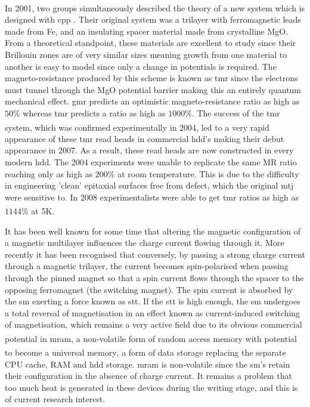 \documentclass[a4paper, 12pt]{article}
\newcommand{\site}[1]{\textsuperscript{\textcolor{blue}{\cite{#1}}}}
\begin{document}
	\par In 2001, two groups simultaneously described the theory of a new system\textsuperscript{\textcolor{blue}{\cite{tunnel1,tunnel2}}} which is designed with \gls{cpp} . Their original system was a trilayer with ferromagnetic leads made from Fe, and an insulating spacer material made from crystalline MgO. From a theoretical standpoint, these materials are excellent to study since their Brillouin zones are of very similar sizes meaning growth from one material to another is easy to model since only a change in potentials is required. The magneto-resistance produced by this scheme is known as \gls{tmr} since the electrons must tunnel through the MgO potential barrier making this an entirely quantum mechanical effect. \gls{gmr} predicts an optimistic magneto-resistance ratio as high as $50\%$ whereas \gls{tmr} predicts a ratio as high as $1000\%$.
	The success of the \gls{tmr} system, which was confirmed experimentally in 2004\textsuperscript{\textcolor{blue}{\cite{2004,2004P}}}, led to a very rapid appearance of these \gls{tmr} read heads in commercial \gls{hdd}'s making their debut appearance in 2007. As a result, these read heads are now constructed in every modern \gls{hdd}. The 2004 experiments were unable to replicate the same MR ratio reaching only as high as $200\%$ at room temperature. This is due to the difficulty in engineering 'clean' epitaxial surfaces free from defect, which the original \gls{mtj} were sensitive to. In 2008 experimentalists were able to get \gls{tmr} ratios as high as $1144\%$ at 5K\textsuperscript{\textcolor{blue}{\cite{1100}}}.
	\par It	has been well known for some time that altering the magnetic configuration of a magnetic multilayer influences the charge current flowing through it. More recently it has been recognised that conversely, by passing a strong charge current through a magnetic trilayer, the current becomes spin-polarised when passing through the pinned magnet so that a spin current flows through the spacer to the opposing ferromagnet (the switching magnet). The spin current is absorbed by the \gls{sm} exerting a force known as \gls{stt}. If the \gls{stt} is high enough, the \gls{sm} undergoes a total reversal of magnetisation in an effect known as current-induced switching of magnetisation, which remains a very active field due to its obvious commercial potential in \gls{mram}\textsuperscript{\textcolor{blue}{\cite{stt}}}, a non-volatile form of random access memory with potential to become a universal memory\site{universal}, a form of data storage replacing the separate CPU cache, RAM and \gls{hdd} storage. \gls{mram} is non-volatile since the \gls{sm}'s retain their configuration in the absence of charge current. It remains a problem that too much heat is generated in these devices during the writing stage, and this is of current research interest.
\end{document}
